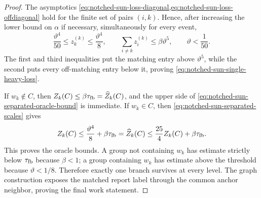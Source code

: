 \begin{proof}
The asymptotics
\cref{eq:notched-sun-loss-diagonal,eq:notched-sun-loss-offdiagonal} hold for
the finite set of pairs $(i,k)$.  Hence, after increasing the lower bound on
$\alpha$ if necessary, simultaneously for every event,
\begin{equation}
 \frac{\vartheta^4}{50}
 \leq z_k^{(k)}\leq\frac{\vartheta^4}{8},
 \qquad
 \sum_{i\neq k}z_i^{(k)}\leq\beta\vartheta^5,
 \qquad
 \vartheta<\frac1{50}.
 \label{eq:notched-sun-separated-scales}
\end{equation}
The first and third inequalities put the matching entry above
$\vartheta^5$, while the second puts every off-matching entry below it,
proving \cref{eq:notched-sun-single-heavy-loss}.

If $w_k\notin C$, then
$Z_k(C)\leq\beta\tau_{\rm fb}=\widehat Z_k(C)$, and the upper side of
\cref{eq:notched-sun-separated-oracle-bound} is immediate.  If $w_k\in C$,
then \cref{eq:notched-sun-separated-scales} gives
\begin{equation*}
 Z_k(C)\leq\frac{\vartheta^4}{8}+\beta\tau_{\rm fb}
 =\widehat Z_k(C)
 \leq\frac{25}{4}Z_k(C)+\beta\tau_{\rm fb}.
\end{equation*}
This proves the oracle bounds.  A group not containing $w_k$ has estimate
strictly below $\tau_{\rm fb}$ because $\beta<1$; a group containing $w_k$
has estimate above the threshold because $\vartheta<1/8$.  Therefore exactly
one branch survives at every level.  The graph construction exposes the
matched report label through the common anchor neighbor, proving the final
work statement.
\end{proof}


